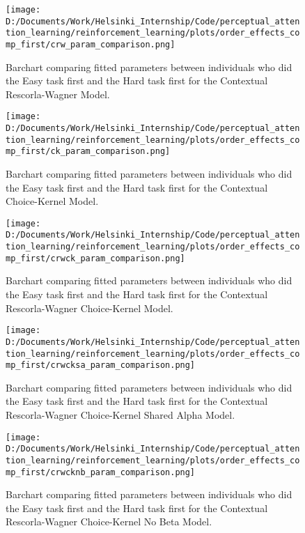 \documentclass[12pt]{article}
\newcommand{\scale}{0.4}
\begin{document}
\begin{figure}[h]  %
	\centering
	\texttt{[image: D:/Documents/Work/Helsinki\_Internship/Code/perceptual\_attention\_learning/reinforcement\_learning/plots/order\_effects\_comp\_first/crw\_param\_comparison.png]}  %
	\caption{Barchart comparing fitted parameters between individuals who did the Easy task first and the Hard task first for the Contextual Rescorla-Wagner Model.}
	\label{fig:crw_model_effects}
\end{figure} 

\begin{figure}[h]  %
	\centering
	\texttt{[image: D:/Documents/Work/Helsinki\_Internship/Code/perceptual\_attention\_learning/reinforcement\_learning/plots/order\_effects\_comp\_first/ck\_param\_comparison.png]}  %
	\caption{Barchart comparing fitted parameters between individuals who did the Easy task first and the Hard task first for the Contextual Choice-Kernel Model.}
	\label{fig:ck_model_effects}
\end{figure} 

\begin{figure}[h]  %
	\centering
	\texttt{[image: D:/Documents/Work/Helsinki\_Internship/Code/perceptual\_attention\_learning/reinforcement\_learning/plots/order\_effects\_comp\_first/crwck\_param\_comparison.png]}  %
	\caption{Barchart comparing fitted parameters between individuals who did the Easy task first and the Hard task first for the Contextual Rescorla-Wagner Choice-Kernel Model.}
	\label{fig:crwck_model_effects}
\end{figure} 

\begin{figure}[h]  %
	\centering
	\texttt{[image: D:/Documents/Work/Helsinki\_Internship/Code/perceptual\_attention\_learning/reinforcement\_learning/plots/order\_effects\_comp\_first/crwcksa\_param\_comparison.png]}  %
	\caption{Barchart comparing fitted parameters between individuals who did the Easy task first and the Hard task first for the Contextual Rescorla-Wagner Choice-Kernel Shared Alpha Model.}
	\label{fig:crwcksa_model_effects}
\end{figure} 

\begin{figure}[h]  %
	\centering
	\texttt{[image: D:/Documents/Work/Helsinki\_Internship/Code/perceptual\_attention\_learning/reinforcement\_learning/plots/order\_effects\_comp\_first/crwcknb\_param\_comparison.png]}  %
	\caption{Barchart comparing fitted parameters between individuals who did the Easy task first and the Hard task first for the Contextual Rescorla-Wagner Choice-Kernel No Beta Model.}
	\label{fig:crwcknb_model_effects}
\end{figure} 
\end{document}
